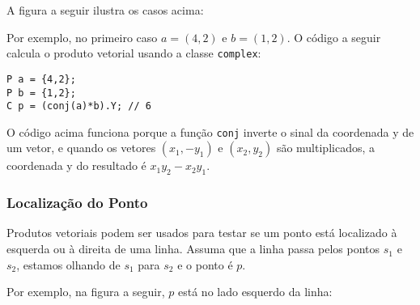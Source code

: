 A figura a seguir ilustra os casos acima:
\begin{center}
\end{center}

\noindent
Por exemplo, no primeiro caso
$a=(4,2)$ e $b=(1,2)$.
O código a seguir calcula o produto vetorial
usando a classe \texttt{complex}:

\begin{lstlisting}
P a = {4,2};
P b = {1,2};
C p = (conj(a)*b).Y; // 6
\end{lstlisting}

O código acima funciona porque
a função \texttt{conj} inverte o sinal da coordenada y
de um vetor,
e quando os vetores $(x_1,-y_1)$ e $(x_2,y_2)$
são multiplicados, a coordenada y
do resultado é $x_1 y_2 - x_2 y_1$.

\subsubsection{Localização do Ponto}

Produtos vetoriais podem ser usados para testar
se um ponto está localizado à esquerda ou à direita
de uma linha.
Assuma que a linha passa pelos pontos
$s_1$ e $s_2$, estamos olhando de $s_1$
para $s_2$ e o ponto é $p$.

Por exemplo, na figura a seguir,
$p$ está no lado esquerdo da linha:
\begin{center}
\end{center}

